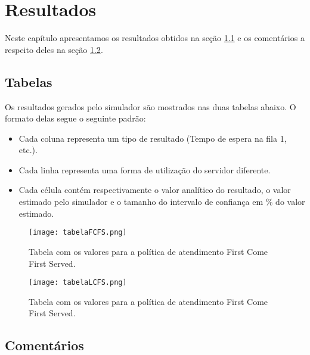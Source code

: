 \chapter{Resultados}

Neste capítulo apresentamos os resultados obtidos na seção \ref{sec:tabelas} e os comentários a respeito deles na seção \ref{sec:coment}.

\section{Tabelas}
\label{sec:tabelas}

Os resultados gerados pelo simulador são mostrados nas duas tabelas abaixo. O formato delas segue o seguinte padrão:\\
\begin{itemize}
  \item Cada coluna representa um tipo de resultado (Tempo de espera na fila 1, etc.).
  \item Cada linha representa uma forma de utilização do servidor diferente.
  \item Cada célula contém respectivamente o valor analítico do resultado, o valor estimado pelo simulador e o tamanho do intervalo de confiança em \% do valor estimado.
\end{itemize}

\begin{figure}
   \texttt{[image: tabelaFCFS.png]}
   \caption{Tabela com os valores para a política de atendimento First Come First Served.}
\end{figure}

\begin{figure}
   \texttt{[image: tabelaLCFS.png]}
   \caption{Tabela com os valores para a política de atendimento First Come First Served.}
\end{figure}

\section{Comentários}
\label{sec:coment}
